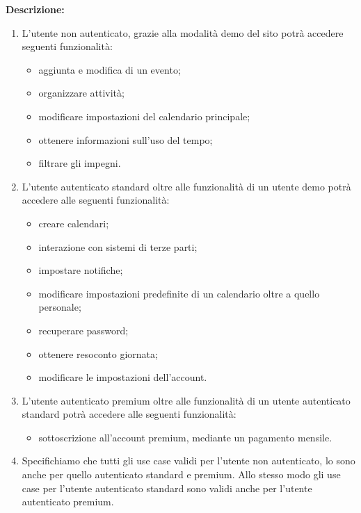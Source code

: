\begin{listaPersonale}[UC]{}
    \textbf{Descrizione:}
    \begin{enumerate}
        \item L'utente non autenticato, grazie alla modalità demo del sito potrà accedere seguenti funzionalità:
              \begin{itemize}
                  \item aggiunta e modifica di un evento;
                  \item organizzare attività;
                  \item modificare impostazioni del calendario principale;
                  \item ottenere informazioni sull'uso del tempo;
                  \item filtrare gli impegni.
              \end{itemize}
        \item L'utente autenticato standard oltre alle funzionalità di un utente demo potrà accedere alle seguenti funzionalità:
              \begin{itemize}
                  \item creare calendari;
                  \item interazione con sistemi di terze parti;
                  \item impostare notifiche;
                  \item modificare impostazioni predefinite di un calendario oltre a quello personale;
                  \item recuperare password;
                  \item ottenere resoconto giornata;
                  \item modificare le impostazioni dell'account.
              \end{itemize}
        \item L'utente autenticato premium oltre alle funzionalità di un utente autenticato standard potrà accedere alle seguenti funzionalità:
              \begin{itemize}
                  \item sottoscrizione all'account premium, mediante un pagamento mensile.
              \end{itemize}
        \item Specifichiamo che tutti gli use case validi per l'utente non autenticato, lo sono anche per quello autenticato standard e premium. Allo stesso modo gli use case per l'utente autenticato standard sono validi anche per l'utente autenticato premium.
    \end{enumerate}







\end{listaPersonale}
